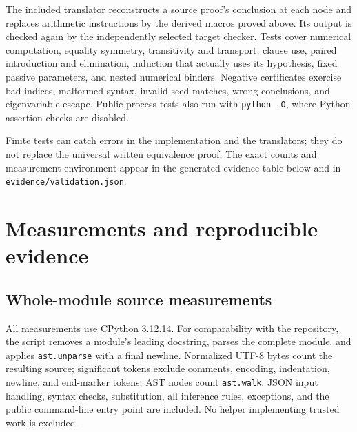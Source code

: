 \documentclass[11pt,letterpaper]{article}
\newcommand{\file}[1]{\nolinkurl{#1}}
\begin{document}
The included translator reconstructs a source proof's conclusion at each
node and replaces arithmetic instructions by the derived macros proved
above. Its output is checked again by the independently selected target
checker. Tests cover numerical computation, equality symmetry,
transitivity and transport, clause use, paired introduction and
elimination, induction that actually uses its hypothesis, fixed passive
parameters, and nested numerical binders. Negative certificates exercise
bad indices, malformed syntax, invalid seed matches, wrong conclusions,
and eigenvariable escape. Public-process tests also run with
\file{python -O}, where Python assertion checks are disabled.

Finite tests can catch errors in the implementation and the translators;
they do not replace the universal written equivalence proof. The exact
counts and measurement environment appear in the generated evidence table
below and in \file{evidence/validation.json}.

\section{Measurements and reproducible evidence}

\subsection{Whole-module source measurements}

All measurements use CPython 3.12.14. For comparability with the repository,
the script removes a module's leading docstring, parses the complete
module, and applies \file{ast.unparse} with a final newline. Normalized
UTF-8 bytes count the resulting source; significant tokens exclude
comments, encoding, indentation, newline, and end-marker tokens; AST
nodes count \file{ast.walk}. JSON input handling, syntax checks,
substitution, all inference rules, exceptions, and the public command-line
entry point are included. No helper implementing trusted work is excluded.
\end{document}
